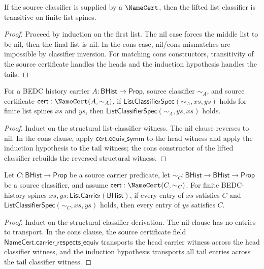 \begin{theorem}
\label{thm:list-classifier-trans-from-namecert}
If the source classifier is supplied by a \(\NameCert\), then the lifted list classifier is transitive on finite list spines.
\end{theorem}

\begin{proof}
Proceed by induction on the first list. The nil case forces the middle list to be nil, then the final list is nil. In the cons case, nil/cons mismatches are impossible by classifier inversion. For matching cons constructors, transitivity of the source certificate handles the heads and the induction hypothesis handles the tails.
\end{proof}

\begin{theorem}
\label{thm:list-classifier-symm-from-namecert}
For a BEDC history carrier $A : \mathsf{BHist} \to \mathsf{Prop}$, source classifier $\sim_A$, and source certificate $\mathsf{cert} : \NameCert(A,\sim_A)$, if $\mathsf{ListClassifierSpec}(\sim_A,xs,ys)$ holds for finite list spines $xs$ and $ys$, then $\mathsf{ListClassifierSpec}(\sim_A,ys,xs)$ holds.
\end{theorem}
\begin{proof}
Induct on the structural list-classifier witness. The nil clause reverses to nil. In the cons clause, apply $\mathsf{cert.equiv\_symm}$ to the head witness and apply the induction hypothesis to the tail witness; the cons constructor of the lifted classifier rebuilds the reversed structural witness.
\end{proof}

\begin{theorem}
\label{thm:list-carrier-transport-from-namecert}
Let $C:\mathsf{BHist}\to\mathsf{Prop}$ be a source carrier predicate, let $\sim_C:\mathsf{BHist}\to\mathsf{BHist}\to\mathsf{Prop}$ be a source classifier, and assume $\mathsf{cert}:\NameCert(C,\sim_C)$. For finite BEDC-history spines $xs,ys:\mathsf{ListCarrier}(\mathsf{BHist})$, if every entry of $xs$ satisfies $C$ and $\mathsf{ListClassifierSpec}(\sim_C,xs,ys)$ holds, then every entry of $ys$ satisfies $C$.
\end{theorem}
\begin{proof}
Induct on the structural classifier derivation. The nil clause has no entries to transport. In the cons clause, the source certificate field $\mathsf{NameCert.carrier\_respects\_equiv}$ transports the head carrier witness across the head classifier witness, and the induction hypothesis transports all tail entries across the tail classifier witness.
\end{proof}
